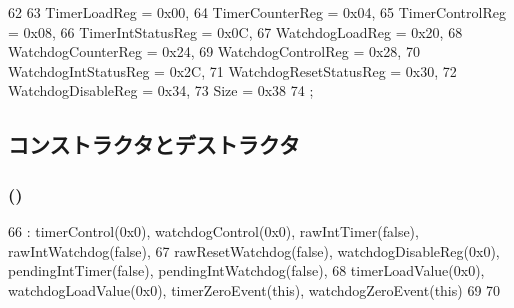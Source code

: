 \begin{DoxyCode}
62              {
63             TimerLoadReg           = 0x00,
64             TimerCounterReg        = 0x04,
65             TimerControlReg        = 0x08,
66             TimerIntStatusReg      = 0x0C,
67             WatchdogLoadReg        = 0x20,
68             WatchdogCounterReg     = 0x24,
69             WatchdogControlReg     = 0x28,
70             WatchdogIntStatusReg   = 0x2C,
71             WatchdogResetStatusReg = 0x30,
72             WatchdogDisableReg     = 0x34,
73             Size                   = 0x38
74         };
\end{DoxyCode}


\subsection{コンストラクタとデストラクタ}
\hypertarget{classCpuLocalTimer_1_1Timer_a6a8bc5014802d569f6d01c4f36121a81}{
\subsubsection[{Timer}]{ ()}}
\label{classCpuLocalTimer_1_1Timer_a6a8bc5014802d569f6d01c4f36121a81}



\begin{DoxyCode}
66     : timerControl(0x0), watchdogControl(0x0), rawIntTimer(false), 
      rawIntWatchdog(false),
67       rawResetWatchdog(false), watchdogDisableReg(0x0), pendingIntTimer(false), 
      pendingIntWatchdog(false),
68       timerLoadValue(0x0), watchdogLoadValue(0x0), timerZeroEvent(this), 
      watchdogZeroEvent(this)
69 {
70 }
\end{DoxyCode}


